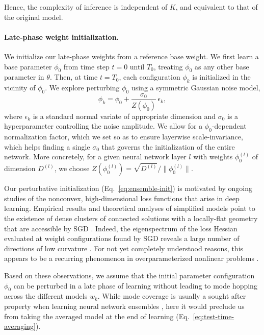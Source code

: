 \documentclass{article} \usepackage{iclr2021_conference,times}
\begin{document}
Hence, the complexity of inference is independent of $K$, and equivalent to that of the original model.

\paragraph{Late-phase weight initialization.} We initialize our late-phase weights from a reference base weight. We first learn a base parameter $\phi_0$ from time step $t=0$ until $T_0$, treating $\phi_0$ as any other base parameter in $\theta$. Then, at time $t=T_0$, each configuration $\phi_k$ is initialized in the vicinity of $\phi_0$. We explore perturbing $\phi_0$ using a symmetric Gaussian noise model,
\begin{equation}
\label{eq:ensemble-init}
    \phi_k = \phi_0 +  \frac{\sigma_0}{Z(\phi_0)} \, \epsilon_k,
\end{equation}
where $\epsilon_k$ is a standard normal variate of appropriate dimension and $\sigma_0$ is a hyperparameter controlling the noise amplitude. We allow for a $\phi_0$-dependent normalization factor, which we set so as to ensure layerwise scale-invariance, which helps finding a single $\sigma_0$ that governs the initialization of the entire network. More concretely, for a given neural network layer $l$ with weights $\phi_0^{(l)}$ of dimension $D^{(l)}$, we choose $Z(\phi_0^{(l)}) = \sqrt{D^{(l)}} / \| \phi_0^{(l)} \|$.

Our perturbative initialization (Eq.~\ref{eq:ensemble-init}) is motivated by ongoing studies of the nonconvex, high-dimensional loss functions that arise in deep learning. Empirical results and theoretical analyses of simplified models point to the existence of dense clusters of connected solutions with a locally-flat geometry \citep{hochreiter_flat_1997} that are accessible by SGD \citep{huang_snapshot_2017,garipov_loss_2018,baldassi_shaping_2020}. Indeed, the eigenspectrum of the loss Hessian evaluated at weight configurations found by SGD reveals a large number of directions of low curvature \citep{keskar_large-batch_2017,chaudhari_entropy-sgd_2019,sagun_empirical_2018}. For not yet completely understood reasons, this appears to be a recurring phenomenon in overparameterized nonlinear problems \citep[][]{brown_statistical_2003,waterfall_sloppy-model_2006}.

Based on these observations, we assume that the initial parameter configuration $\phi_0$ can be perturbed in a late phase of learning without leading to mode hopping across the different models $w_k$. While mode coverage is usually a sought after property when learning neural network ensembles \citep{fort_deep_2020}, here it would preclude us from taking the averaged model at the end of learning (Eq.~\ref{eq:test-time-averaging}).
\end{document}
